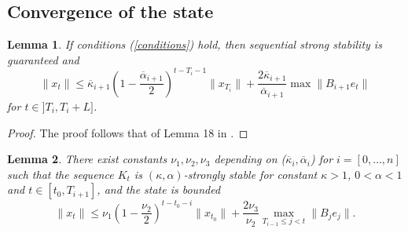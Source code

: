 \documentclass[letterpaper, 10 pt, conference]{ieeeconf}  %
\newtheorem{lemma}{Lemma}
\begin{document}
\subsection{Convergence of the state}
\begin{lemma}
\label{conv_state}
If conditions (\ref{conditions}) hold, then sequential strong stability is guaranteed and 
$$
    \|x_t\| \leq \overline{\kappa}_{i+1} (1-\frac{\overline{\alpha}_{i+1}}{2})^{t-T_i-1}\|x_{T_i}\| +\frac{2\overline{\kappa}_{i+1}}{\overline{\alpha}_{i+1}} \max \|B_{i+1} e_t\|
$$
for $t \in ]T_i, T_i+L]$.
\end{lemma} \vspace{2mm} 
\begin{proof}
    The proof follows that of Lemma 18 in \cite{zhao2025policy}. 
\end{proof}
\begin{lemma}
\label{theorem}There exist constants $\nu_1, \nu_2, \nu_3$ depending on ($\overline{\kappa}_i, \overline{\alpha}_i$) for $i = [0,\dots,n]$ such that the sequence $K_t$ is $(\kappa, \alpha)$-strongly stable for constant $\kappa > 1$, $0 < \alpha < 1$ and $t\in [t_0, T_{i+1}]$, and the state is bounded
$$
    \|x_t\| \leq \nu_1 (1-\frac{\nu_2}{2})^{t-t_0-i}\|x_{t_0}\| +\frac{2\nu_3}{\nu_2} \underset{T_{i-1}\leq j < t}{\max} \|B_j e_j\|.
$$
\end{lemma} \vspace{2mm} 
\end{document}

